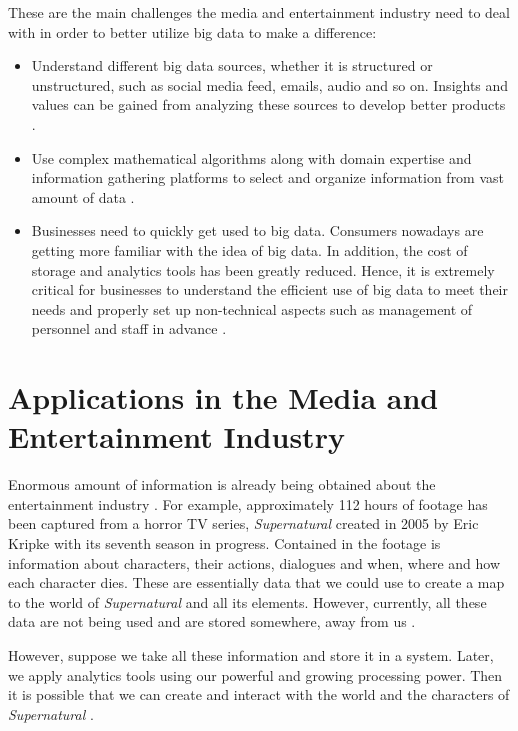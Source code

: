 These are the main challenges the media and entertainment industry need to deal with in order to better utilize big data to make a difference:
\begin{itemize}

  \item Understand different big data sources, whether it is structured or unstructured, such as social media feed, emails, audio and so on. Insights and values can be gained from analyzing these sources to develop better products \cite{Lippell2016sectors}.
 
  \item Use complex mathematical algorithms along with domain expertise and information gathering platforms to select and organize information from vast amount of data \cite{Lippell2016sectors}.
 
  \item Businesses need to quickly get used to big data. Consumers nowadays are getting more familiar with the idea of big data. In addition, the cost of storage and analytics tools has been greatly reduced. Hence, it is extremely critical for businesses to understand the efficient use of big data to meet their needs and properly set up non-technical aspects such as management of personnel and staff in advance \cite{Lippell2016sectors}.
 
\end{itemize}

\section{Applications in the Media and Entertainment Industry}

Enormous amount of information is already being obtained about the entertainment industry \cite{Schlieski2012data}. For example, approximately 112 hours of footage has been captured from a horror TV series, {\em Supernatural} created in 2005 by Eric Kripke with its seventh season in progress. Contained in the footage is information about characters, their actions, dialogues and when, where and how each character dies. These are essentially data that we could use to create a map to the world of {\em Supernatural} and all its elements. However, currently, all these data are not being used and are stored somewhere, away from us \cite{Schlieski2012data}.

However, suppose we take all these information and store it in a system. Later, we apply analytics tools using our powerful and growing processing power. Then it is possible that we can create and interact with the world and the characters of {\em Supernatural} \cite{Schlieski2012data}.

